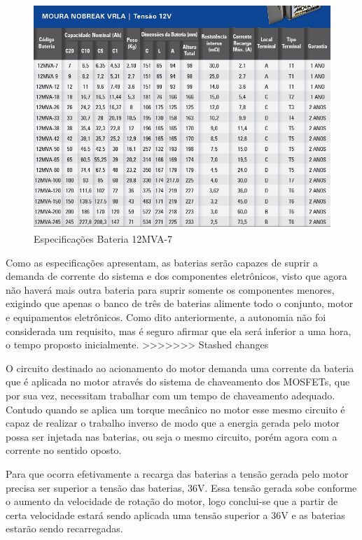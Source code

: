 	\begin{figure}[!htb]
		\centering
		\includegraphics[scale=0.5]{especificacao_bateria.jpeg}
		\caption{Especificações Bateria 12MVA-7}
		\label{img:especificacaobateria}
	\end{figure}
	
Como as especificações apresentam, as baterias serão capazes de suprir a demanda de corrente do sistema e dos componentes eletrônicos, visto que agora não haverá mais outra bateria para suprir somente os componentes menores, exigindo que apenas o banco de três de baterias alimente todo o conjunto, motor e equipamentos eletrônicos. Como dito anteriormente, a autonomia não foi considerada um requisito, mas é seguro afirmar que ela será inferior a uma hora, o tempo proposto inicialmente.
>>>>>>> Stashed changes

O circuito destinado ao acionamento do motor demanda uma corrente da bateria que é aplicada no motor através do sistema de chaveamento dos MOSFETs, que por sua vez, necessitam trabalhar com um tempo de chaveamento adequado. Contudo quando se aplica um torque mecânico no motor esse mesmo circuito é capaz de realizar o trabalho inverso de modo que a energia gerada pelo motor possa ser injetada nas baterias, ou seja o mesmo circuito, porém agora com a corrente no sentido oposto.

Para que ocorra efetivamente a recarga das baterias a tensão gerada pelo motor precisa ser superior a tensão das baterias, 36V. Essa tensão gerada sobe conforme o aumento da velocidade de rotação do motor, logo conclui-se que a partir de certa velocidade estará sendo aplicada uma tensão superior a 36V e as baterias estarão sendo recarregadas.

